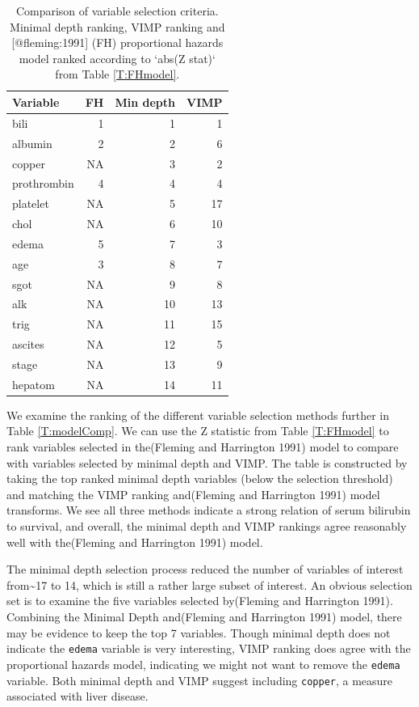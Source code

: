 \documentclass[article]{jss}
\begin{document}
\begin{Schunk}
\begin{table}

\caption{Comparison of variable selection criteria. Minimal depth ranking, VIMP ranking and [@fleming:1991] (FH) proportional hazards model ranked according to `abs(Z stat)` from Table \ref{T:FHmodel}.}
\centering
\begin{tabular}[t]{l|r|r|r}
\hline
Variable & FH & Min depth & VIMP\\
\hline
bili & 1 & 1 & 1\\
\hline
albumin & 2 & 2 & 6\\
\hline
copper & NA & 3 & 2\\
\hline
prothrombin & 4 & 4 & 4\\
\hline
platelet & NA & 5 & 17\\
\hline
chol & NA & 6 & 10\\
\hline
edema & 5 & 7 & 3\\
\hline
age & 3 & 8 & 7\\
\hline
sgot & NA & 9 & 8\\
\hline
alk & NA & 10 & 13\\
\hline
trig & NA & 11 & 15\\
\hline
ascites & NA & 12 & 5\\
\hline
stage & NA & 13 & 9\\
\hline
hepatom & NA & 14 & 11\\
\hline
\end{tabular}
\end{table}

\end{Schunk}

We examine the ranking of the different variable selection methods
further in Table \ref{T:modelComp}. We can use the Z statistic from
Table \ref{T:FHmodel} to rank variables selected in the(Fleming and
Harrington 1991) model to compare with variables selected by minimal
depth and VIMP. The table is constructed by taking the top ranked
minimal depth variables (below the selection threshold) and matching the
VIMP ranking and(Fleming and Harrington 1991) model transforms. We see
all three methods indicate a strong relation of serum bilirubin to
survival, and overall, the minimal depth and VIMP rankings agree
reasonably well with the(Fleming and Harrington 1991) model.

The minimal depth selection process reduced the number of variables of
interest from\textasciitilde{}17 to 14, which is still a rather large
subset of interest. An obvious selection set is to examine the five
variables selected by(Fleming and Harrington 1991). Combining the
Minimal Depth and(Fleming and Harrington 1991) model, there may be
evidence to keep the top 7 variables. Though minimal depth does not
indicate the \texttt{edema} variable is very interesting, VIMP ranking
does agree with the proportional hazards model, indicating we might not
want to remove the \texttt{edema} variable. Both minimal depth and VIMP
suggest including \texttt{copper}, a measure associated with liver
disease.
\end{document}
